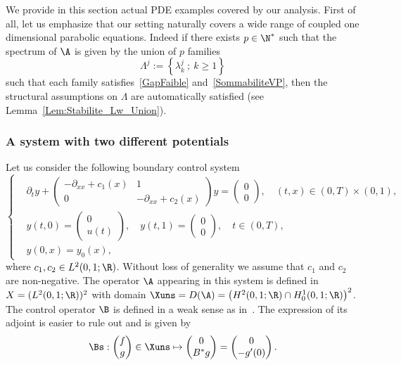 We provide in this section actual PDE examples covered by our analysis. First of all, let us emphasize that our setting naturally covers a wide range of coupled one dimensional parabolic equations. Indeed if there exists $p \in \N^*$ such that the spectrum of $\A$ is given by the union of $p$ families
\[
\Lambda^j := \left\{ \lambda_k^j \: ; \: k \geq 1 \right\}
\]
such that each family satisfies~\eqref{GapFaible} and~\eqref{SommabiliteVP}, then the structural assumptions on $\Lambda$ are automatically satisfied (see Lemma~\ref{Lem:Stabilite_Lw_Union}).



\subsubsection{A system with two different potentials} \label{sec_two_potentials}
Let us consider the following boundary control system
\begin{equation}\label{systeme_en_c}
\begin{cases}
& \partial_t y +
\begin{pmatrix} - \partial_{xx} + c_1(x) & 1 \\ 0 & -\partial_{xx} + c_2(x)
\end{pmatrix} y =
\begin{pmatrix} 0 \\ 0
\end{pmatrix},
\quad (t,x) \in (0,T) \times (0,1),
\\[0.15em] 
&y(t,0) =
\begin{pmatrix} 0 \\ u(t)
\end{pmatrix}, \quad y(t,1) =
\begin{pmatrix} 0 \\ 0
\end{pmatrix}, \quad t\in (0,T),
\\[0.15em] 
&y(0,x) = y_0(x),
\end{cases}
\end{equation}
where $c_1,c_2\in L^2(0,1;\R)$. Without loss of generality we assume that $c_1$ and $c_2$ are non-negative. The operator $\A$ appearing in this system is defined in $X=(L^2(0,1 ; \R))^2$ with domain $\Xuns=D(\A)= \left(H^2(0,1 ; \R) \cap H^1_0 (0,1 ; \R) \right)^2$. The control operator $\B$ is defined in a weak sense as in~\cite{TucsnakWeissBook}. The expression of its adjoint is easier to rule out and is given by
\[
\Bs :
\begin{pmatrix} f \\ g
\end{pmatrix} \in \Xuns \mapsto
\begin{pmatrix} 0 \\ B^* g
\end{pmatrix} =
\begin{pmatrix} 0 \\ -g'(0)
\end{pmatrix}.
\]
